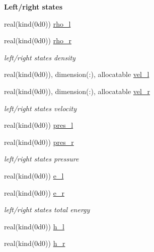 \begin{Indent}\textbf{ Left/right states}\par
\begin{DoxyCompactItemize}
\item 
real(kind(0d0)) \hyperlink{namespacem__variables__conversion_aa5ce8a8bee676634917c9ab8f5d22c21}{rho\+\_\+l}
\item 
real(kind(0d0)) \hyperlink{namespacem__variables__conversion_a05df52959cedafb938a98a6afd93274c}{rho\+\_\+r}
\begin{DoxyCompactList}\small\item\em left/right states density \end{DoxyCompactList}\item 
real(kind(0d0)), dimension(\+:), allocatable \hyperlink{namespacem__variables__conversion_a9ef76270f02246abad03ce449673de84}{vel\+\_\+l}
\item 
real(kind(0d0)), dimension(\+:), allocatable \hyperlink{namespacem__variables__conversion_a7e09e021d90fc326b8869c854321b9f2}{vel\+\_\+r}
\begin{DoxyCompactList}\small\item\em left/right states velocity \end{DoxyCompactList}\item 
real(kind(0d0)) \hyperlink{namespacem__variables__conversion_a46be9183c95b82af0d7552cd16f487f1}{pres\+\_\+l}
\item 
real(kind(0d0)) \hyperlink{namespacem__variables__conversion_a36ee8d46fb5ce8b870cabc66ec1d62ba}{pres\+\_\+r}
\begin{DoxyCompactList}\small\item\em left/right states pressure \end{DoxyCompactList}\item 
real(kind(0d0)) \hyperlink{namespacem__variables__conversion_a7cd906bb65027a37f6e53ed835f74cfc}{e\+\_\+l}
\item 
real(kind(0d0)) \hyperlink{namespacem__variables__conversion_a679b4b915633d222074a89abcbfe35dc}{e\+\_\+r}
\begin{DoxyCompactList}\small\item\em left/right states total energy \end{DoxyCompactList}\item 
real(kind(0d0)) \hyperlink{namespacem__variables__conversion_a7f9d10004d2efcf06092c8e83afd90a9}{h\+\_\+l}
\item 
real(kind(0d0)) \hyperlink{namespacem__variables__conversion_a00d96d7b614a5c0ce7dbe96d556b0342}{h\+\_\+r}

\end{DoxyCompactItemize}
\end{Indent}
